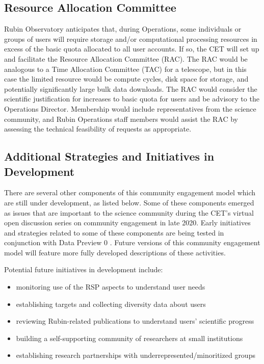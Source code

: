 \documentclass[DM,lsstdraft,toc]{lsstdoc}
\begin{document}
\subsection{Resource Allocation Committee}\label{ssec:mod_rac}

Rubin Observatory anticipates that, during Operations, some individuals or groups of users will require storage and/or computational processing resources in excess of the basic quota allocated to all user accounts.
If so, the CET will set up and facilitate the Resource Allocation Committee (RAC).
The RAC would be analogous to a Time Allocation Committee (TAC) for a telescope, but in this case the limited resource would be compute cycles, disk space for storage, and potentially significantly large bulk data downloads.
The RAC would consider the scientific justification for increases to basic quota for users and be advisory to the Operations Director.
Membership would include representatives from the science community, and Rubin Operations staff members would assist the RAC by assessing the technical feasibility of requests as appropriate.

\subsection{Additional Strategies and Initiatives in Development}

There are several other components of this community engagement model which are still under development, as listed below.
Some of these components emerged as issues that are important to the science community during the CET's virtual open discussion series on community engagement in late 2020. 
Early initiatives and strategies related to some of these components are being tested in conjunction with Data Preview 0 .
Future versions of this community engagement model will feature more fully developed descriptions of these activities.

Potential future initiatives in development include:
\begin{itemize}
\item monitoring use of the RSP aspects to understand user needs
\item establishing targets and collecting diversity data about users
\item reviewing Rubin-related publications to understand users' scientific progress
\item building a self-supporting community of researchers at small institutions
\item establishing research partnerships with underrepresented/minoritized groups
\end{itemize}
\end{document}
